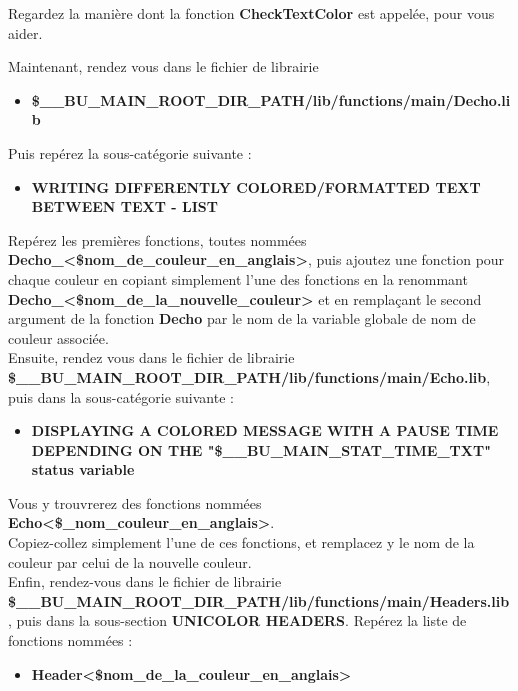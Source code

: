 \documentclass[a4paper,10pt]{article}
\begin{document}
\begin{justify}
    Regardez la manière dont la fonction \textbf{\color{mauve}CheckTextColor} est appelée, pour vous aider.
\end{justify}


Maintenant, rendez vous dans le fichier de librairie
\begin{itemize}
    \item \textbf{\color{orange}\$\_\_BU\_MAIN\_ROOT\_DIR\_PATH\color{lime}/lib/functions/main/Decho.lib}\\[1\baselineskip]
\end{itemize}

Puis repérez la sous-catégorie suivante :
\begin{itemize}
    \item \textbf{WRITING DIFFERENTLY COLORED/FORMATTED TEXT BETWEEN TEXT - LIST}\\[1\baselineskip]
\end{itemize}

Repérez les premières fonctions, toutes nommées \textbf{\color{mauve}Decho\_<\$nom\_de\_couleur\_en\_anglais>}, puis ajoutez une fonction pour chaque couleur en copiant simplement l'une des fonctions en la renommant \textbf{\color{mauve}Decho\_<\$nom\_de\_la\_nouvelle\_couleur>} et en remplaçant le second argument de la fonction \textbf{\color{mauve}Decho} par le nom de la variable globale de nom de couleur associée.\\[2\baselineskip]


Ensuite, rendez vous dans le fichier de librairie \textbf{\color{orange}\$\_\_BU\_MAIN\_ROOT\_DIR\_PATH\color{lime}/lib/functions/main/Echo.lib}, puis dans la sous-catégorie suivante :\\
\begin{itemize}
    \item \textbf{DISPLAYING A COLORED MESSAGE WITH A PAUSE TIME DEPENDING ON THE "\$\_\_BU\_MAIN\_STAT\_TIME\_TXT" status variable}\\[1\baselineskip]
\end{itemize}

 Vous y trouvrerez des fonctions nommées \textbf{\color{mauve}Echo<\$\_nom\_couleur\_en\_anglais>}.\\[1\baselineskip]
 
 Copiez-collez simplement l'une de ces fonctions, et remplacez y le nom de la couleur par celui de la nouvelle couleur.\\[2\baselineskip]


Enfin, rendez-vous dans le fichier de librairie \textbf{\color{orange}\$\_\_BU\_MAIN\_ROOT\_DIR\_PATH\color{lime}/lib/functions/main/Headers.lib}, puis dans la sous-section \textbf{UNICOLOR HEADERS}. Repérez la liste de fonctions nommées :
\begin{itemize}
    \item \textbf{\color{mauve}Header<\$nom\_de\_la\_couleur\_en\_anglais>}\linebreak
\end{itemize}
\end{document}
